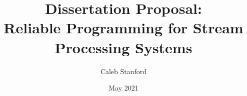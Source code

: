 \documentclass{article}
\title{\Large{} Dissertation Proposal: \\ Reliable Programming for Stream Processing Systems}
\author{Caleb Stanford}
\date{May 2021}
\begin{document}
\maketitle{}



\tableofcontents{}











\renewcommand{\refname}{Other References}


\end{document}

